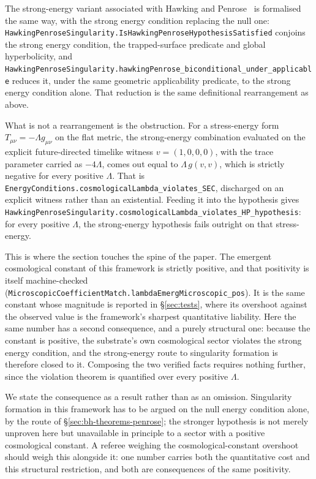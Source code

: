 \documentclass[aps,prd,nofootinbib,superscriptaddress,12pt]{revtex4-2}
\DeclareRobustCommand{\lb}{\discretionary{}{}{}}
\begin{document}
The strong-energy variant associated with Hawking and
Penrose~\cite{HawkingPenrose1970} is formalised the same way, with the strong
energy condition replacing the null one:
\texttt{Hawking\lb{}Penrose\lb{}Singularity.\lb{}Is\lb{}Hawking\lb{}Penrose\lb{}Hypothesis\lb{}Satisfied} conjoins
the strong energy condition, the trapped-surface predicate and global
hyperbolicity, and
\texttt{Hawking\lb{}Penrose\lb{}Singularity.\lb{}hawking\lb{}Penrose\_\lb{}biconditional\_\lb{}under\_\lb{}applicable}
reduces it, under the same geometric applicability predicate, to the strong
energy condition alone. That reduction is the same definitional rearrangement as
above.

What is not a rearrangement is the obstruction. For a stress-energy form
$T_{\mu\nu} = -\Lambda g_{\mu\nu}$ on the flat metric, the strong-energy
combination evaluated on the explicit future-directed timelike witness
$v = (1,0,0,0)$, with the trace parameter carried as $-4\Lambda$, comes out equal
to $\Lambda\, g(v,v)$, which is strictly negative for every positive $\Lambda$.
That is \texttt{Energy\lb{}Conditions.\lb{}cosmological\lb{}Lambda\_\lb{}violates\_\lb{}SEC}, discharged
on an explicit witness rather than an existential. Feeding it into the hypothesis
gives \texttt{Hawking\lb{}Penrose\lb{}Singularity.\lb{}cosmological\lb{}Lambda\_\lb{}violates\_\lb{}HP\_\lb{}hypothesis}:
for every positive $\Lambda$, the strong-energy hypothesis fails outright on that
stress-energy.

This is where the section touches the spine of the paper. The emergent
cosmological constant of this framework is strictly positive, and that positivity
is itself machine-checked
(\texttt{Microscopic\lb{}Coefficient\lb{}Match.\lb{}lambda\lb{}Emerg\lb{}Microscopic\_\lb{}pos}). It is the same
constant whose magnitude is reported in \S\ref{sec:tests}, where its overshoot
against the observed value is the framework's sharpest quantitative liability.
Here the same number has a second consequence, and a purely structural one:
because the constant is positive, the substrate's own cosmological sector
violates the strong energy condition, and the strong-energy route to singularity
formation is therefore closed to it. Composing the two verified facts requires
nothing further, since the violation theorem is quantified over every positive
$\Lambda$.

We state the consequence as a result rather than as an omission. Singularity
formation in this framework has to be argued on the null energy condition alone,
by the route of \S\ref{sec:bh-theorems-penrose}; the stronger hypothesis is not
merely unproven here but unavailable in principle to a sector with a positive
cosmological constant. A referee weighing the cosmological-constant overshoot
should weigh this alongside it: one number carries both the quantitative cost and
this structural restriction, and both are consequences of the same positivity.
\end{document}
